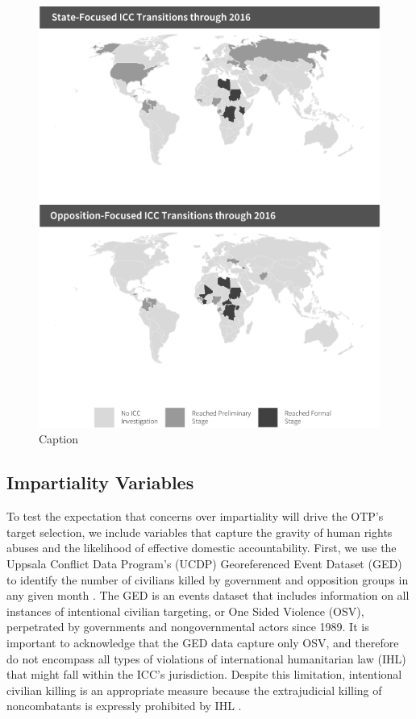 \begin{figure}
    \centering
    \includegraphics[width=1\textwidth]{iccMaps.pdf}
    \caption{Caption}
    \label{fig:iccMaps}
\end{figure}
\FloatBarrier

\subsection{Impartiality Variables}

To test the expectation that concerns over impartiality will drive the OTP's target selection, we include variables that capture the gravity of human rights abuses and the likelihood of effective domestic accountability. First, we use the Uppsala Conflict Data Program's (UCDP) Georeferenced Event Dataset (GED) to identify the number of civilians killed by government and opposition groups in any given month \citep{sundberg2013introducing}. The GED is an events dataset that includes information on all instances of intentional civilian targeting, or One Sided Violence (OSV), perpetrated by governments and nongovernmental actors since 1989. It is important to acknowledge that the GED data capture only OSV, and therefore do not encompass all types of violations of international humanitarian law (IHL) that might fall within the ICC's jurisdiction. Despite this limitation, intentional civilian killing is an appropriate measure because the extrajudicial killing of noncombatants is expressly prohibited by IHL \citep{blank2018international}.

